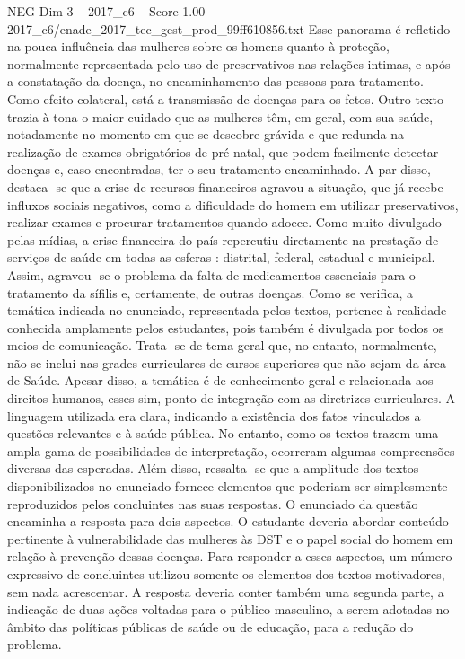 \begin{textsample}{NEG Dim 3 – 2017\_c6 – Score 1.00 – 2017\_c6/enade\_2017\_tec\_gest\_prod\_99ff610856.txt}
Esse panorama é refletido na pouca influência das mulheres sobre os homens quanto à proteção, normalmente representada pelo uso de preservativos nas relações intimas, e após a constatação da doença, no encaminhamento das pessoas para tratamento.
Como efeito colateral, está a transmissão de doenças para os fetos.
Outro texto trazia à tona o maior cuidado que as mulheres têm, em geral, com sua saúde, notadamente no momento em que se descobre grávida e que redunda na realização de exames obrigatórios de pré-natal, que podem facilmente detectar doenças e, caso encontradas, ter o seu tratamento encaminhado.
A par disso, destaca -se que a crise de recursos financeiros agravou a situação, que já recebe influxos sociais negativos, como a dificuldade do homem em utilizar preservativos, realizar exames e procurar tratamentos quando adoece.
Como muito divulgado pelas mídias, a crise financeira do país repercutiu diretamente na prestação de serviços de saúde em todas as esferas : distrital, federal, estadual e municipal.
Assim, agravou -se o problema da falta de medicamentos essenciais para o tratamento da sífilis e, certamente, de outras doenças.
Como se verifica, a temática indicada no enunciado, representada pelos textos, pertence à realidade conhecida amplamente pelos estudantes, pois também é divulgada por todos os meios de comunicação.
Trata -se de tema geral que, no entanto, normalmente, não se inclui nas grades curriculares de cursos superiores que não sejam da área de Saúde.
Apesar disso, a temática é de conhecimento geral e relacionada aos direitos humanos, esses sim, ponto de integração com as diretrizes curriculares.
A linguagem utilizada era clara, indicando a existência dos fatos vinculados a questões relevantes e à saúde pública.
No entanto, como os textos trazem uma ampla gama de possibilidades de interpretação, ocorreram algumas compreensões diversas das esperadas.
Além disso, ressalta -se que a amplitude dos textos disponibilizados no enunciado fornece elementos que poderiam ser simplesmente reproduzidos pelos concluintes nas suas respostas.
O enunciado da questão encaminha a resposta para dois aspectos.
O estudante deveria abordar conteúdo pertinente à vulnerabilidade das mulheres às DST e o papel social do homem em relação à prevenção dessas doenças.
Para responder a esses aspectos, um número expressivo de concluintes utilizou somente os elementos dos textos motivadores, sem nada acrescentar.
A resposta deveria conter também uma segunda parte, a indicação de duas ações voltadas para o público masculino, a serem adotadas no âmbito das políticas públicas de saúde ou de educação, para a redução do problema.

\end{textsample}
